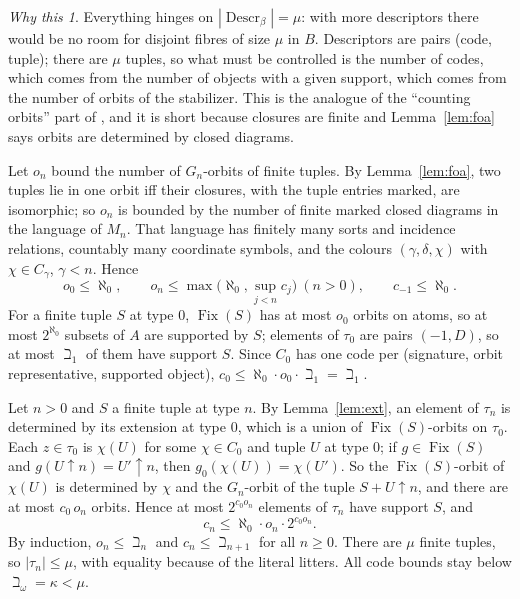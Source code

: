 \documentclass[11pt]{article}
\theoremstyle{definition}
\theoremstyle{remark}
\newtheorem*{idea}{Why this}
\newcommand{\Fix}{\operatorname{Fix}}
\newcommand{\Descr}{\operatorname{Descr}}
\newcommand{\up}{\!\uparrow\!}
\begin{document}
\begin{idea}
Everything hinges on \(|\Descr_\beta|=\mu\): with more descriptors there
would be no room for disjoint fibres of size \(\mu\) in \(B\). Descriptors
are pairs (code, tuple); there are \(\mu\) tuples, so what must be
controlled is the number of codes, which comes from the number of objects
with a given support, which comes from the number of orbits of the
stabilizer. This is the analogue of the ``counting orbits'' part of
\cite{HW}, and it is short because closures are finite and
Lemma~\ref{lem:foa} says orbits are determined by closed diagrams.
\end{idea}

Let \(o_n\) bound the number of \(G_n\)-orbits of finite tuples. By
Lemma~\ref{lem:foa}, two tuples lie in one orbit iff their closures, with
the tuple entries marked, are isomorphic; so \(o_n\) is bounded by the
number of finite marked closed diagrams in the language of \(M_n\). That
language has finitely many sorts and incidence relations, countably many
coordinate symbols, and the colours
\((\gamma,\delta,\chi)\) with \(\chi\in C_\gamma\), \(\gamma<n\). Hence
\[
 o_0\leq\aleph_0,\qquad o_n\leq\max\bigl(\aleph_0,\sup_{j<n}c_j\bigr)
 \ (n>0),\qquad c_{-1}\leq\aleph_0.
\]
For a finite tuple \(S\) at type \(0\), \(\Fix(S)\) has at most \(o_0\)
orbits on atoms, so at most \(2^{\aleph_0}\) subsets of \(A\) are
supported by \(S\); elements of \(\tau_0\) are pairs \((-1,D)\), so at
most \(\beth_1\) of them have support \(S\). Since \(C_0\) has one code per
(signature, orbit representative, supported object),
\(c_0\leq\aleph_0\cdot o_0\cdot\beth_1=\beth_1\).

Let \(n>0\) and \(S\) a finite tuple at type \(n\). By
Lemma~\ref{lem:ext}, an element of \(\tau_n\) is determined by its
extension at type \(0\), which is a union of \(\Fix(S)\)-orbits on
\(\tau_0\). Each \(z\in\tau_0\) is \(\chi(U)\) for some \(\chi\in C_0\)
and tuple \(U\) at type \(0\); if \(g\in\Fix(S)\) and \(g(U\up n)=U'\up
n\), then \(g_0(\chi(U))=\chi(U')\). So the \(\Fix(S)\)-orbit of
\(\chi(U)\) is determined by \(\chi\) and the \(G_n\)-orbit of the tuple
\(S{+}U\up n\), and there are at most \(c_0\,o_n\) orbits. Hence at most
\(2^{c_0o_n}\) elements of \(\tau_n\) have support \(S\), and
\[
 c_n\leq\aleph_0\cdot o_n\cdot2^{c_0o_n}.
\]
By induction, \(o_n\leq\beth_n\) and \(c_n\leq\beth_{n+1}\) for all
\(n\geq0\). There are \(\mu\) finite tuples, so \(|\tau_n|\leq\mu\), with
equality because of the literal litters. All code bounds stay below
\(\beth_\omega=\kappa<\mu\).
\end{document}
